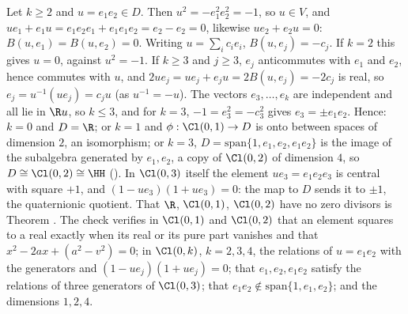 Let $k \ge 2$ and $u = e_{1}e_{2} \in D$. Then $u^{2} = -e_{1}^{2}e_{2}^{2} = -1$, so $u \in V$, and $ue_{1} + e_{1}u = e_{1}e_{2}e_{1} + e_{1}e_{1}e_{2} = e_{2} - e_{2} = 0$, likewise $ue_{2} + e_{2}u = 0$: $B(u, e_{1}) = B(u, e_{2}) = 0$. Writing $u = \sum_{i}c_{i}e_{i}$, $B(u, e_{j}) = -c_{j}$. If $k = 2$ this gives $u = 0$, against $u^{2} = -1$. If $k \ge 3$ and $j \ge 3$, $e_{j}$ anticommutes with $e_{1}$ and $e_{2}$, hence commutes with $u$, and $2ue_{j} = ue_{j} + e_{j}u = 2B(u, e_{j}) = -2c_{j}$ is real, so $e_{j} = u^{-1}(ue_{j}) = c_{j}u$ (as $u^{-1} = -u$). The vectors $e_{3}, \dots, e_{k}$ are independent and all lie in $\R u$, so $k \le 3$, and for $k = 3$, $-1 = e_{3}^{2} = -c_{3}^{2}$ gives $e_{3} = \pm e_{1}e_{2}$. Hence: $k = 0$ and $D = \R$; or $k = 1$ and $\phi: \Cl(0,1) \to D$ is onto between spaces of dimension $2$, an isomorphism; or $k = 3$, $D = \mathrm{span}\{1, e_{1}, e_{2}, e_{1}e_{2}\}$ is the image of the subalgebra generated by $e_{1}, e_{2}$, a copy of $\Cl(0,2)$ of dimension $4$, so $D \cong \Cl(0,2) \cong \HH$ (). In $\Cl(0,3)$ itself the element $ue_{3} = e_{1}e_{2}e_{3}$ is central with square $+1$, and $(1 - ue_{3})(1 + ue_{3}) = 0$: the map to $D$ sends it to $\pm 1$, the quaternionic quotient. That $\R$, $\Cl(0,1)$, $\Cl(0,2)$ have no zero divisors is Theorem . The check verifies in $\Cl(0,1)$ and $\Cl(0,2)$ that an element squares to a real exactly when its real or its pure part vanishes and that $x^{2} - 2ax + (a^{2} - v^{2}) = 0$; in $\Cl(0,k)$, $k = 2, 3, 4$, the relations of $u = e_{1}e_{2}$ with the generators and $(1 - ue_{j})(1 + ue_{j}) = 0$; that $e_{1}, e_{2}, e_{1}e_{2}$ satisfy the relations of three generators of $\Cl(0,3)$; that $e_{1}e_{2} \notin \mathrm{span}\{1, e_{1}, e_{2}\}$; and the dimensions $1, 2, 4$.

